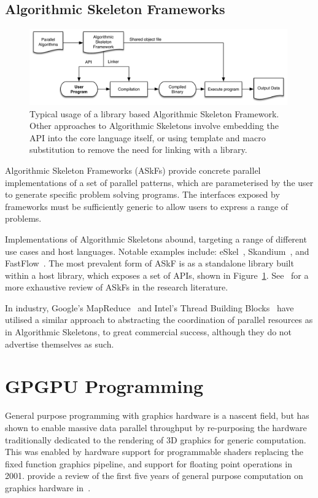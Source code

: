 \subsection{Algorithmic Skeleton Frameworks}

\begin{figure}
\centering
\includegraphics[width=0.99\textwidth]{img/askf}
\caption{%
  Typical usage of a library based Algorithmic Skeleton
  Framework. Other approaches to Algorithmic Skeletons involve
  embedding the API into the core language itself, or using template
  and macro substitution to remove the need for linking with a
  library.%
}
\label{fig:askf}
\end{figure}

Algorithmic Skeleton Frameworks (ASkFs) provide concrete parallel
implementations of a set of parallel patterns, which are parameterised
by the user to generate specific problem solving programs. The
interfaces exposed by frameworks must be sufficiently generic to allow
users to express a range of problems.

Implementations of Algorithmic Skeletons abound, targeting a range of
different use cases and host languages. Notable examples include:
eSkel~\cite{Benoit2005a}, Skandium~\cite{Leyton2010}, and
FastFlow~\cite{Aldinucci2011}. The most prevalent form of ASkF is as a
standalone library built within a host library, which exposes a set of
APIs, shown in Figure~\ref{fig:askf}. See~\cite{Gonzalez2010} for a
more exhaustive review of ASkFs in the research literature.

In industry, Google's MapReduce~\cite{Dean2008} and Intel's Thread
Building Blocks~\cite{IntelTBB} have utilised a similar approach to
abstracting the coordination of parallel resources as in Algorithmic
Skeletons, to great commercial success, although they do not advertise
themselves as such.


\section{GPGPU Programming}\label{sec:gpgpu}

General purpose programming with graphics hardware is a nascent field,
but has shown to enable massive data parallel throughput by
re-purposing the hardware traditionally dedicated to the rendering of
3D graphics for generic computation. This was enabled by hardware
support for programmable shaders replacing the fixed function graphics
pipeline, and support for floating point operations in
2001. \citeauthor{Owens2006} provide a review of the first five years
of general purpose computation on graphics hardware
in~\cite{Owens2006}.


